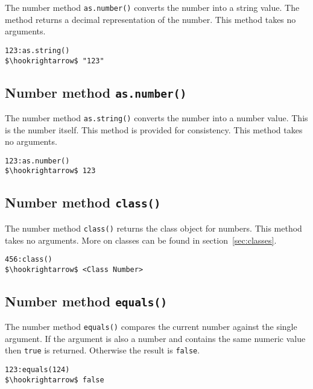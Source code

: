 \documentclass[11pt,a4paper]{scrbook}
\newcommand\keyword[1]{\texttt{#1}}
\newcommand\method[1]{\texttt{#1}}
\begin{document}
The number method \method{as.number()} converts the number into a string
value. The method returns a decimal representation of the number. This method
takes no arguments.

\begin{lstlisting}[language=BibTool,mathescape=true]
123:as.string()
$\hookrightarrow$ "123"
\end{lstlisting}

\subsection{Number method \method{as.number()}}

The number method \method{as.string()} converts the number into a number
value. This is the number itself. This method is provided for consistency.
This method takes no arguments.

\begin{lstlisting}[language=BibTool,mathescape=true]
123:as.number()
$\hookrightarrow$ 123
\end{lstlisting}

\subsection{Number method \method{class()}}

The number method \method{class()} returns the class object for numbers. This
method takes no arguments. More on classes can be found in
section~\ref{sec:classes}.

\begin{lstlisting}[language=BibTool,mathescape=true]
456:class()
$\hookrightarrow$ <Class Number>
\end{lstlisting}

\subsection{Number method \method{equals()}}

The number method \method{equals()} compares the current number against the
single argument. If the argument is also a number and contains the same
numeric value then \keyword{true} is returned. Otherwise the result is
\keyword{false}.

\begin{lstlisting}[language=BibTool,mathescape=true]
123:equals(124)
$\hookrightarrow$ false
\end{lstlisting}


\end{document}
